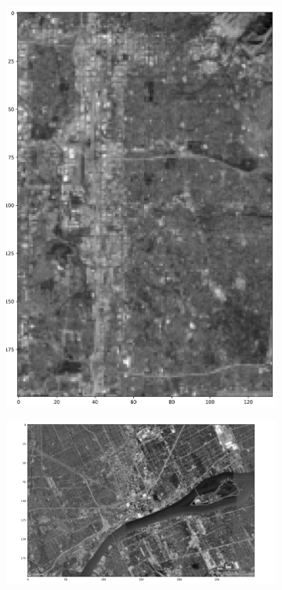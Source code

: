 \documentclass[
  letterpaper,
  DIV=11,
  numbers=noendperiod]{scrreprt}
\begin{document}
\begin{figure}
\begin{minipage}{0.33\linewidth}
\begin{figure}[H]
{\centering \includegraphics{images/plots/aerial_cities/1.jpg}

}


\end{figure}%

\end{minipage}%
%
\begin{minipage}{0.33\linewidth}

\begin{figure}[H]

{\centering \includegraphics{images/plots/aerial_cities/2.jpg}

}
\end{figure}
\end{minipage}
\end{figure}
\end{document}
